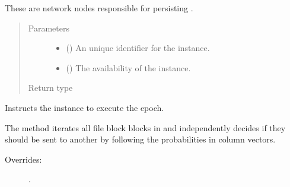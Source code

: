 \documentclass[letterpaper,10pt,english]{sphinxmanual}
\begin{document}
\begin{fulllineitems}
\begin{fulllineitems}
These are network nodes responsible for persisting
.
\begin{quote}\begin{description}
\item[{Parameters}] \leavevmode\begin{itemize}
\item {} 
 () \textendash{} An unique identifier for the  instance.

\item {} 
 () \textendash{} The availability of the  instance.

\end{itemize}

\item[{Return type}] \leavevmode
{}

\end{description}\end{quote}

\end{fulllineitems}


\begin{fulllineitems}
\label{\detokenize{app.domain:app.domain.network_nodes.SGNode.execute_epoch}}
Instructs the  instance to execute the epoch.

The method iterates all file block blocks in  and
independently decides if they should be sent to another 
by following the probabilities in {\hyperref[\detokenize{app.domain:app.domain.network_nodes.SGNode.routing_table}]{}} column
vectors.
\begin{description}
\item[{Overrides:}] \leavevmode
{\hyperref[\detokenize{app.domain:app.domain.network_nodes.Node.execute_epoch}]{}}.


\end{description}
\end{fulllineitems}
\end{fulllineitems}
\end{document}
